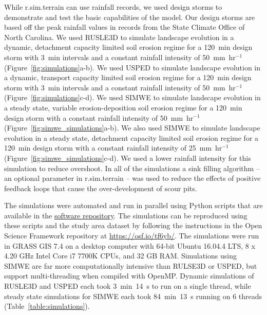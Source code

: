 \documentclass[gmd, manuscript]{copernicus}
\begin{document}
While r.sim.terrain can use rainfall records,
we used design storms to demonstrate and test 
the basic capabilities of the model. 
Our design storms are based off the peak rainfall values
in records from the State Climate Office of North Carolina.
We used RUSLE3D to simulate landscape evolution
in a dynamic, detachment capacity limited soil erosion regime
for a 120~\unit{min} design storm
with 3~\unit{min} intervals 
and a constant rainfall intensity of 50~\unit{mm~hr}$^{-1}$
(Figure~\ref{fig:simulations}a-b).
%
We used USPED to simulate landscape evolution
in a dynamic, transport capacity limited soil erosion regime
for a 120~\unit{min} design storm
with 3~\unit{min} intervals 
and a constant rainfall intensity of 50~\unit{mm~hr}$^{-1}$
(Figure~\ref{fig:simulations}c-d).
%
We used SIMWE to simulate landscape evolution
in a steady state, variable erosion-deposition soil erosion regime
for a 120~\unit{min} design storm
with a constant rainfall intensity of 50~\unit{mm~hr}$^{-1}$
(Figure~\ref{fig:simwe_simulations}a-b). 
%
We also used SIMWE to simulate landscape evolution
in a steady state, detachment capacity limited soil erosion regime
for a 120~\unit{min} design storm
with a constant rainfall intensity of 25~\unit{mm~hr}$^{-1}$
(Figure~\ref{fig:simwe_simulations}c-d).
We used a lower rainfall intensity for this simulation 
to reduce overshoot.
%
In all of the simulations 
a sink filling algorithm
-- an optional parameter in r.sim.terrain -- 
was used to reduce the effects of positive feedback loops
that cause the over-development of scour pits. 

The simulations were automated and run in parallel
using Python scripts that are available in the 
\href{https://github.com/baharmon/landscape_evolution}{software repository}.
The simulations can be reproduced using these scripts
and the study area dataset 
by following the instructions 
in the Open Science Framework repository 
at \url{https://osf.io/tf6yb/}.
The simulations were run 
in GRASS GIS 7.4 
on a desktop computer 
with 64-bit Ubuntu 16.04.4 LTS,
8 x 4.20 GHz Intel Core i7 7700K CPUs,
and 32 GB RAM. 
Simulations using SIMWE 
are far more computationally intensive
than RULSE3D or USPED, 
but support multi-threading 
when compiled with OpenMP. 
Dynamic simulations of RUSLE3D and USPED each took
3~\unit{min}~14~\unit{s} to run on a single thread, 
while steady state simulations for SIMWE each took 
84~\unit{min}~13~\unit{s} running on 6 threads
(Table~\ref{table:simulations}).
\end{document}
